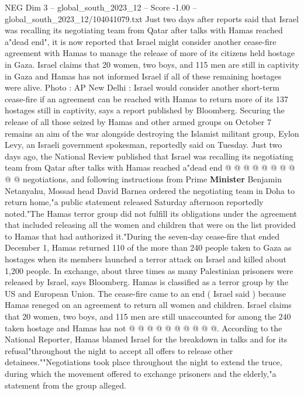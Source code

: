 \begin{textsample}{NEG Dim 3 – global\_south\_2023\_12 – Score -1.00 – global\_south\_2023\_12/104041079.txt}  \label{ex:f3_neg_035}
Just two days after reports said that Israel was recalling its negotiating team from Qatar after talks with Hamas reached a"dead end", it is now reported that Israel might consider another cease-fire agreement with Hamas to manage the release of more of its citizens held hostage in Gaza.
Israel claims that 20 women, two boys, and 115 men are still in captivity in Gaza and Hamas has not informed Israel if all of these remaining hostages were alive.
Photo : AP New Delhi : Israel would consider another short-term cease-fire if an agreement can be reached with Hamas to return more of its 137 hostages still in captivity, says a report published by Bloomberg.
Securing the release of all those seized by Hamas and other armed groups on October 7 remains an aim of the war alongside destroying the Islamist militant group, Eylon Levy, an Israeli government spokesman, reportedly said on Tuesday.
Just two days ago, the National Review published that Israel was recalling its negotiating team from Qatar after talks with Hamas reached a"dead end @ @ @ @ @ @ @ @ @ @ negotiations, and following instructions from Prime \textbf{Minister} Benjamin Netanyahu, Mossad head David Barnea ordered the negotiating team in Doha to return home,"a public statement released Saturday afternoon reportedly noted."The Hamas terror group did not fulfill its obligations under the agreement that included releasing all the women and children that were on the list provided to Hamas that had authorized it."During the seven-day cease-fire that ended December 1, Hamas returned 110 of the more than 240 people taken to Gaza as hostages when its members launched a terror attack on Israel and killed about 1,200 people.
In exchange, about three times as many Palestinian prisoners were released by Israel, says Bloomberg.
Hamas is classified as a terror group by the US and European Union.
The cease-fire came to an end ( Israel said ) because Hamas reneged on an agreement to return all women and children.
Israel claims that 20 women, two boys, and 115 men are still unaccounted for among the 240 taken hostage and Hamas has not @ @ @ @ @ @ @ @ @ @.
According to the National Reporter, Hamas blamed Israel for the breakdown in talks and for its refusal"throughout the night to accept all offers to release other detainees.""Negotiations took place throughout the night to extend the truce, during which the movement offered to exchange prisoners and the elderly,"a statement from the group alleged.

\end{textsample}
